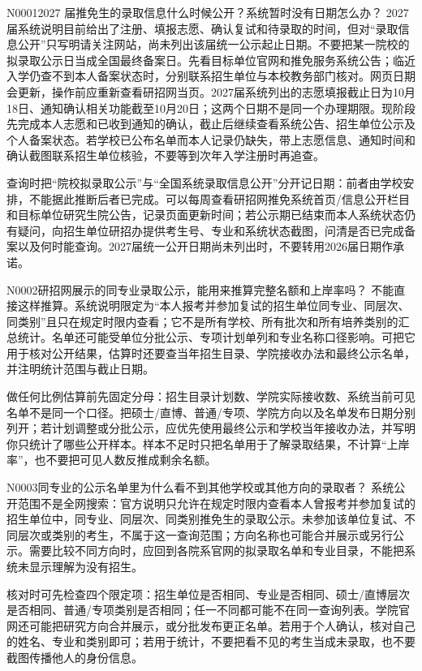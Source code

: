 \begin{qa}{N0001}{2027 届推免生的录取信息什么时候公开？系统暂时没有日期怎么办？}
2027 届系统说明目前给出了注册、填报志愿、确认复试和待录取的时间，但对“录取信息公开”只写明请关注网站，尚未列出该届统一公示起止日期。不要把某一院校的拟录取公示日当成全国最终备案日。先看目标单位官网和推免服务系统公告；临近入学仍查不到本人备案状态时，分别联系招生单位与本校教务部门核对。网页日期会更新，操作前应重新查看研招网当页。2027届系统列出的志愿填报截止日为10月18日、通知确认相关功能截至10月20日；这两个日期不是同一个办理期限。现阶段先完成本人志愿和已收到通知的确认，截止后继续查看系统公告、招生单位公示及个人备案状态。若学校已公布名单而本人记录仍缺失，带上志愿信息、通知时间和确认截图联系招生单位核验，不要等到次年入学注册时再追查。

查询时把“院校拟录取公示”与“全国系统录取信息公开”分开记日期：前者由学校安排，不能据此推断后者已完成。可以每周查看研招网推免系统首页/信息公开栏目和目标单位研究生院公告，记录页面更新时间；若公示期已结束而本人系统状态仍有疑问，向招生单位研招办提供考生号、专业和系统状态截图，问清是否已完成备案以及何时能查询。2027届统一公开日期尚未列出时，不要转用2026届日期作承诺。
\end{qa}

\begin{qa}{N0002}{研招网展示的同专业录取公示，能用来推算完整名额和上岸率吗？}
不能直接这样推算。系统说明限定为“本人报考并参加复试的招生单位同专业、同层次、同类别”且只在规定时限内查看；它不是所有学校、所有批次和所有培养类别的汇总统计。名单还可能受单位分批公示、专项计划单列和专业名称口径影响。可把它用于核对公开结果，估算时还要查当年招生目录、学院接收办法和最终公示名单，并注明统计范围与截止日期。

做任何比例估算前先固定分母：招生目录计划数、学院实际接收数、系统当前可见名单不是同一个口径。把硕士/直博、普通/专项、学院方向以及名单发布日期分别列开；若计划调整或分批公示，应优先使用最终公示和学校当年接收办法，并写明你只统计了哪些公开样本。样本不足时只把名单用于了解录取结果，不计算“上岸率”，也不要把可见人数反推成剩余名额。
\end{qa}

\begin{qa}{N0003}{同专业的公示名单里为什么看不到其他学校或其他方向的录取者？}
系统公开范围不是全网搜索：官方说明只允许在规定时限内查看本人曾报考并参加复试的招生单位中，同专业、同层次、同类别推免生的录取公示。未参加该单位复试、不同层次或类别的考生，不属于这一查询范围；方向名称也可能合并展示或另行公示。需要比较不同方向时，应回到各院系官网的拟录取名单和专业目录，不能把系统未显示理解为没有招生。

核对时可先检查四个限定项：招生单位是否相同、专业是否相同、硕士/直博层次是否相同、普通/专项类别是否相同；任一不同都可能不在同一查询列表。学院官网还可能把研究方向合并展示，或分批发布更正名单。若用于个人确认，核对自己的姓名、专业和类别即可；若用于统计，不要把看不见的考生当成未录取，也不要截图传播他人的身份信息。
\end{qa}

